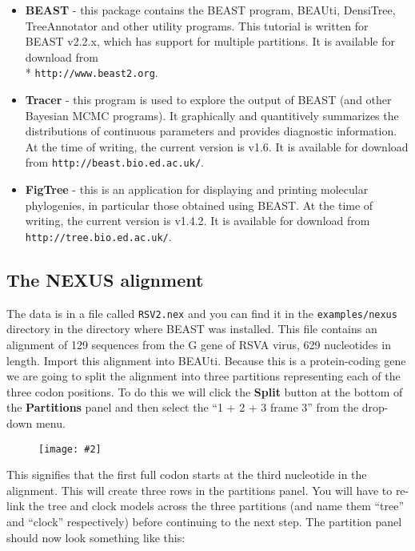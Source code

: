 \documentclass[12pt]{article}
\newcommand{\includeimage}[2][]{%
\texttt{[image: \#2]}
}
\newcommand{\BEASTVersion}{2.2.x}
\newcommand{\TracerVersion}{1.6}
\newcommand{\FigTreeVersion}{1.4.2}
\begin{document}
\begin{itemize}
\item {\bf BEAST} - this package contains the BEAST program, BEAUti, DensiTree, TreeAnnotator and other utility programs. This tutorial is written for BEAST v{\BEASTVersion}, which has support for multiple partitions. It is available for download from \\* \texttt{http://www.beast2.org}.
\item {\bf Tracer} - this program is used to explore the output of BEAST (and other Bayesian MCMC programs). It graphically and
quantitively summarizes the distributions of continuous parameters and provides diagnostic information. At the time of
writing, the current version is v{\TracerVersion}. It is available for download from \texttt{http://beast.bio.ed.ac.uk/}.
\item {\bf FigTree} - this is an application for displaying and printing molecular phylogenies, in particular those obtained using
BEAST. At the time of writing, the current version is v{\FigTreeVersion}. It is available for download from \texttt{http://tree.bio.ed.ac.uk/}.
\end{itemize}

\subsection*{The NEXUS alignment}
The data is in a file called \texttt{RSV2.nex} and you can find it in the {\tt examples/nexus} directory in the directory where BEAST was installed. This file contains an alignment of 129 sequences from the G gene of RSVA virus, 629 nucleotides in length. Import this alignment into BEAUti. Because this is a protein-coding gene we are going to split the alignment into three partitions representing each of the three codon positions. To do this we will click the {\bf Split} button at the bottom of the {\bf Partitions} panel and then select the ``1 + 2 + 3 frame 3'' from the drop-down menu. 

\begin{figure}
\centering	
\includeimage[width=\textwidth]{figures/BEAUti_split}
\label{fig:BEAUti_split}
\end{figure}

This signifies that the first full codon starts at the third nucleotide in the alignment. This will create three rows in the partitions panel. You will have to re-link the tree and clock models across the three partitions (and name them ``tree'' and ``clock'' respectively) before continuing to the next step. The partition panel should now look something like this:
\end{document}
